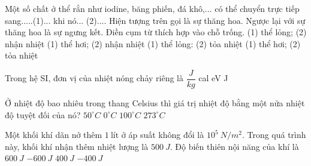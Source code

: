 \begin{ex}
Một số chất ở thể rắn như iodine, băng phiến, đá khô,... có thể chuyển trực tiếp sang.....(1)... khi nó... (2).... Hiện tượng trên gọi là sự thăng hoa. Ngược lại với sự thăng hoa là sự ngưng kết. Điền cụm từ thích hợp vào chỗ trống.
\choice
{(1) thể lỏng; (2) nhận nhiệt}
{\True (1) thể hơi; (2) nhận nhiệt}
{(1) thể lỏng: (2) tỏa nhiệt}
{(1) thể hơi; (2) tỏa nhiệt}
\end{ex}
\begin{ex}
Trong hệ SI, đơn vị của nhiệt nóng chảy riêng là
\choice
{\True $\dfrac{J}{kg}$}
{cal}
{eV}
{J}
\end{ex}
\begin{ex}
Ở nhiệt độ bao nhiêu trong thang Celsius thì giá trị nhiệt độ bằng một nửa nhiệt độ tuyệt đối của nó?
\choice
{$50^\circ C$}
{$0^\circ C$}
{$100^\circ C$}
{\True $273^\circ C$}
\end{ex}
\begin{ex}
Một khối khí dãn nở thêm $1\ \text{lít}$ ở áp suất không đổi là $10^5\ N/m^2$. Trong quá trình này, khối khí nhận thêm nhiệt lượng là $500\ J$. Độ biến thiên nội năng của khí là
\choice
{$600\ J$}
{$-600\ J$}
{\True $400\ J$}
{$-400\ J$}
\end{ex}
